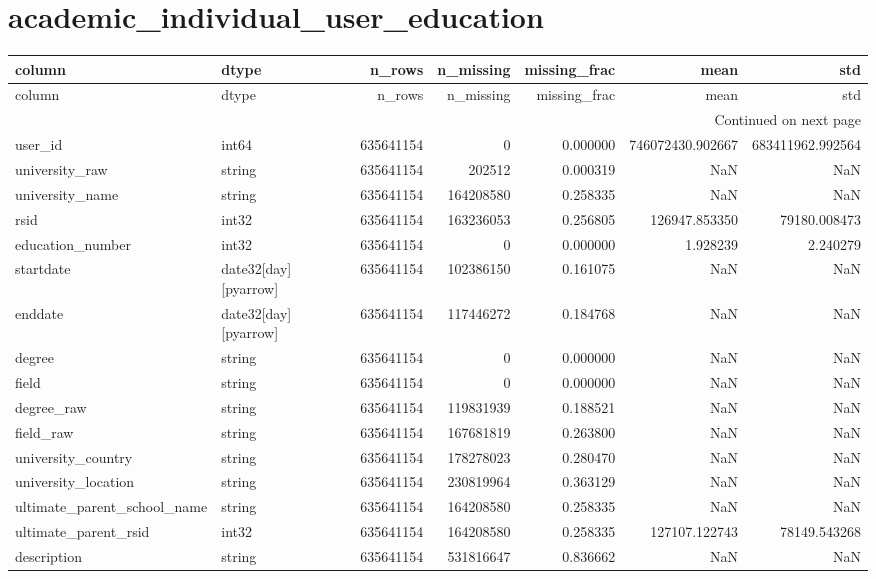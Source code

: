 \documentclass{article}
\begin{document}
\section*{academic_individual_user_education}
\begin{longtable}{llrrrrr}
\toprule
column & dtype & n_rows & n_missing & missing_frac & mean & std \\
\midrule
\endfirsthead
\toprule
column & dtype & n_rows & n_missing & missing_frac & mean & std \\
\midrule
\endhead
\midrule
\multicolumn{7}{r}{Continued on next page} \\
\midrule
\endfoot
\bottomrule
\endlastfoot
user_id & int64 & 635641154 & 0 & 0.000000 & 746072430.902667 & 683411962.992564 \\
university_raw & string & 635641154 & 202512 & 0.000319 & NaN & NaN \\
university_name & string & 635641154 & 164208580 & 0.258335 & NaN & NaN \\
rsid & int32 & 635641154 & 163236053 & 0.256805 & 126947.853350 & 79180.008473 \\
education_number & int32 & 635641154 & 0 & 0.000000 & 1.928239 & 2.240279 \\
startdate & date32[day][pyarrow] & 635641154 & 102386150 & 0.161075 & NaN & NaN \\
enddate & date32[day][pyarrow] & 635641154 & 117446272 & 0.184768 & NaN & NaN \\
degree & string & 635641154 & 0 & 0.000000 & NaN & NaN \\
field & string & 635641154 & 0 & 0.000000 & NaN & NaN \\
degree_raw & string & 635641154 & 119831939 & 0.188521 & NaN & NaN \\
field_raw & string & 635641154 & 167681819 & 0.263800 & NaN & NaN \\
university_country & string & 635641154 & 178278023 & 0.280470 & NaN & NaN \\
university_location & string & 635641154 & 230819964 & 0.363129 & NaN & NaN \\
ultimate_parent_school_name & string & 635641154 & 164208580 & 0.258335 & NaN & NaN \\
ultimate_parent_rsid & int32 & 635641154 & 164208580 & 0.258335 & 127107.122743 & 78149.543268 \\
description & string & 635641154 & 531816647 & 0.836662 & NaN & NaN \\
\end{longtable}
\end{document}
